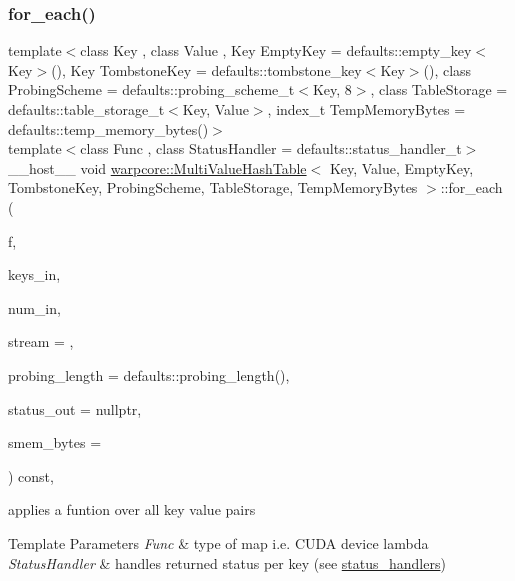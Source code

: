 \subsubsection{\texorpdfstring{for\+\_\+each()}{for\_each()}\hspace{0.1cm}{\footnotesize\ttfamily [3/3]}}
{\footnotesize\ttfamily template$<$class Key , class Value , Key Empty\+Key = defaults\+::empty\+\_\+key$<$\+Key$>$(), Key Tombstone\+Key = defaults\+::tombstone\+\_\+key$<$\+Key$>$(), class Probing\+Scheme  = defaults\+::probing\+\_\+scheme\+\_\+t$<$\+Key, 8$>$, class Table\+Storage  = defaults\+::table\+\_\+storage\+\_\+t$<$\+Key, Value$>$, index\+\_\+t Temp\+Memory\+Bytes = defaults\+::temp\+\_\+memory\+\_\+bytes()$>$ \\
template$<$class Func , class Status\+Handler  = defaults\+::status\+\_\+handler\+\_\+t$>$ \\
\+\_\+\+\_\+host\+\_\+\+\_\+ void \hyperlink{classwarpcore_1_1MultiValueHashTable}{warpcore\+::\+Multi\+Value\+Hash\+Table}$<$ Key, Value, Empty\+Key, Tombstone\+Key, Probing\+Scheme, Table\+Storage, Temp\+Memory\+Bytes $>$\+::for\+\_\+each (\begin{DoxyParamCaption}\item[{Func}]{f,  }\item[{const key\+\_\+type $\ast$const}]{keys\+\_\+in,  }\item[{const index\+\_\+type}]{num\+\_\+in,  }\item[{const cuda\+Stream\+\_\+t}]{stream = {},  }\item[{const index\+\_\+type}]{probing\+\_\+length = {\ttfamily defaults\+:\+:probing\+\_\+length()},  }\item[{typename Status\+Handler\+::base\+\_\+type $\ast$const}]{status\+\_\+out = {\ttfamily nullptr},  }\item[{const index\+\_\+type}]{smem\+\_\+bytes = {} }\end{DoxyParamCaption}) const\hspace{0.3cm}{\ttfamily [inline]}, {\ttfamily [noexcept]}}



applies a funtion over all key value pairs 


\begin{DoxyTemplParams}{Template Parameters}
{\em Func} & type of map i.\+e. C\+U\+DA device lambda \\
\hline
{\em Status\+Handler} & handles returned status per key (see {\ttfamily \hyperlink{namespacewarpcore_1_1status__handlers}{status\+\_\+handlers}}) \\
\hline
\end{DoxyTemplParams}

